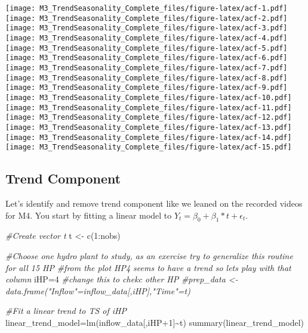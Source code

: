 \documentclass[
]{article}
\newenvironment{Shaded}{\begin{snugshade}}{\end{snugshade}}
\newcommand{\CommentTok}[1]{\textcolor[rgb]{0.56,0.35,0.01}{\textit{#1}}}
\newcommand{\DecValTok}[1]{\textcolor[rgb]{0.00,0.00,0.81}{#1}}
\newcommand{\FunctionTok}[1]{\textcolor[rgb]{0.00,0.00,0.00}{#1}}
\newcommand{\NormalTok}[1]{#1}
\newcommand{\OtherTok}[1]{\textcolor[rgb]{0.56,0.35,0.01}{#1}}
\newcommand{\SpecialCharTok}[1]{\textcolor[rgb]{0.00,0.00,0.00}{#1}}
\begin{document}
\texttt{[image: M3\_TrendSeasonality\_Complete\_files/figure-latex/acf-1.pdf]}
\texttt{[image: M3\_TrendSeasonality\_Complete\_files/figure-latex/acf-2.pdf]}
\texttt{[image: M3\_TrendSeasonality\_Complete\_files/figure-latex/acf-3.pdf]}
\texttt{[image: M3\_TrendSeasonality\_Complete\_files/figure-latex/acf-4.pdf]}
\texttt{[image: M3\_TrendSeasonality\_Complete\_files/figure-latex/acf-5.pdf]}
\texttt{[image: M3\_TrendSeasonality\_Complete\_files/figure-latex/acf-6.pdf]}
\texttt{[image: M3\_TrendSeasonality\_Complete\_files/figure-latex/acf-7.pdf]}
\texttt{[image: M3\_TrendSeasonality\_Complete\_files/figure-latex/acf-8.pdf]}
\texttt{[image: M3\_TrendSeasonality\_Complete\_files/figure-latex/acf-9.pdf]}
\texttt{[image: M3\_TrendSeasonality\_Complete\_files/figure-latex/acf-10.pdf]}
\texttt{[image: M3\_TrendSeasonality\_Complete\_files/figure-latex/acf-11.pdf]}
\texttt{[image: M3\_TrendSeasonality\_Complete\_files/figure-latex/acf-12.pdf]}
\texttt{[image: M3\_TrendSeasonality\_Complete\_files/figure-latex/acf-13.pdf]}
\texttt{[image: M3\_TrendSeasonality\_Complete\_files/figure-latex/acf-14.pdf]}
\texttt{[image: M3\_TrendSeasonality\_Complete\_files/figure-latex/acf-15.pdf]}

\hypertarget{trend-component}{%
\subsection{Trend Component}\label{trend-component}}

Let's identify and remove trend component like we leaned on the recorded
videos for M4. You start by fitting a linear model to
\(Y_t=\beta_0+\beta_1*t+\epsilon_t\).

\begin{Shaded}
\begin{Highlighting}[]
\CommentTok{\#Create vector t}
\NormalTok{t }\OtherTok{\textless{}{-}} \FunctionTok{c}\NormalTok{(}\DecValTok{1}\SpecialCharTok{:}\NormalTok{nobs)}

\CommentTok{\#Choose one hydro plant to study, as an exercise try to generalize this routine for all 15 HP}
\CommentTok{\#from the plot HP4 seems to have a trend so let\textquotesingle{}s play with that column}
\NormalTok{iHP}\OtherTok{=}\DecValTok{4}  \CommentTok{\#change this to chekc other HP}
\CommentTok{\#prep\_data \textless{}{-} data.frame("Inflow"=inflow\_data[,iHP],"Time"=t)}

\CommentTok{\#Fit a linear trend to TS of iHP}
\NormalTok{linear\_trend\_model}\OtherTok{=}\FunctionTok{lm}\NormalTok{(inflow\_data[,iHP}\SpecialCharTok{+}\DecValTok{1}\NormalTok{]}\SpecialCharTok{\textasciitilde{}}\NormalTok{t)  }
\FunctionTok{summary}\NormalTok{(linear\_trend\_model)}
\end{Highlighting}
\end{Shaded}
\end{document}

